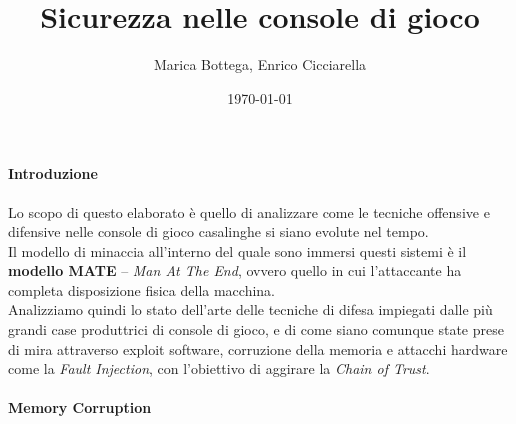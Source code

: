 \documentclass[a4paper,12pt]{article}
\title{Sicurezza nelle console di gioco}
\author{Marica Bottega, Enrico Cicciarella}
\date{\today}
\begin{document}
\maketitle
\thispagestyle{empty}


\paragraph{Introduzione}
Lo scopo di questo elaborato è quello di analizzare come le tecniche offensive e difensive nelle console di gioco casalinghe si siano evolute nel tempo.\\
Il modello di minaccia all'interno del quale sono immersi questi sistemi è il \textbf{modello MATE} -- \textit{Man At The End}, ovvero quello in cui l'attaccante ha completa disposizione fisica della macchina.\\
Analizziamo quindi lo stato dell'arte delle tecniche di difesa impiegati dalle più grandi case produttrici di console di gioco, e di come siano comunque state prese di mira attraverso exploit software, corruzione della memoria e attacchi hardware come la \textit{Fault Injection}, con l’obiettivo di aggirare la \textit{Chain of Trust}.

\paragraph{Memory Corruption}
\end{document}
